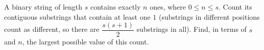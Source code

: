 A binary string of length $s$ contains exactly $n$ ones, where $0\le n\le s$. Count its contiguous substrings that contain at least one $1$ (substrings in different positions count as different, so there are $\dfrac{s(s+1)}{2}$ substrings in all). Find, in terms of $s$ and $n$, the largest possible value of this count.
